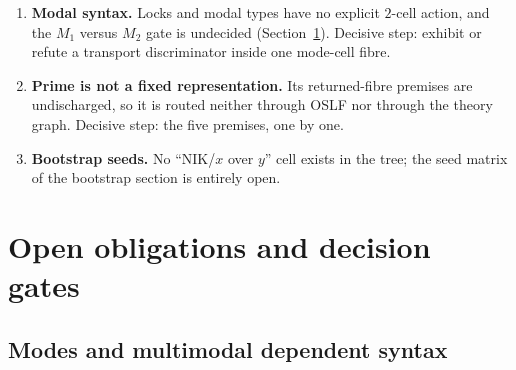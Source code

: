 \documentclass[11pt]{article}
\theoremstyle{definition}
\theoremstyle{remark}
\begin{document}
\begin{enumerate}
  the relevant umbrella now rebuilds against the current Lean executor.
  Its older mode-dispatch cover is only a mode projection. These constructions
  retain canonical-entry admission, explicit handlers and selected execution
  strategies. The remaining C-facing qualification and the strongest
  justified extension beyond admitted states must not be inferred from a
  generated program or from the mode-dispatch table. They belong to the
  lowering lane, not to selection of Prime's logical foundation.
\item \textbf{Modal syntax.}  Locks and modal types have no explicit
  $2$-cell action, and the $M_1$ versus $M_2$ gate is undecided
  (Section~\ref{sec:open-obligations}).  Decisive step: exhibit or refute a
  transport discriminator inside one mode-cell fibre.
\item \textbf{Prime is not a fixed representation.}  Its returned-fibre
  premises are undischarged, so it is routed neither through OSLF nor
  through the theory graph.  Decisive step: the five premises, one by one.
\item \textbf{Bootstrap seeds.}  No ``NIK/$x$ over $y$'' cell exists in the
  tree; the seed matrix of the bootstrap section is entirely open.
\end{enumerate}

\section{Open obligations and decision gates}
\label{sec:open-obligations}

\subsection{Modes and multimodal dependent syntax}
\end{document}
